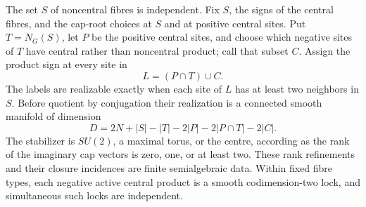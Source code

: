 \begin{theorem}\label{geo:character-atlas}
The set \(S\) of noncentral fibres is independent. Fix \(S\), the signs of the central fibres, and the cap-root choices at \(S\) and at positive central sites. Put \(T=N_G(S)\), let \(P\) be the positive central sites, and choose which negative sites of \(T\) have central rather than noncentral product; call that subset \(C\). Assign the product sign at every site in
\[
                        L=(P\cap T)\cup C.
\]
The labels are realizable exactly when each site of \(L\) has at least two neighbors in \(S\). Before quotient by conjugation their realization is a connected smooth manifold of dimension
\begin{equation}
 D=2N+|S|-|T|-2|P|-2|P\cap T|-2|C|.
 \label{geo:stratumdimension}
\end{equation}
The stabilizer is \(SU(2)\), a maximal torus, or the centre, according as the rank of the imaginary cap vectors is zero, one, or at least two. These rank refinements and their closure incidences are finite semialgebraic data. Within fixed fibre types, each negative active central product is a smooth codimension-two lock, and simultaneous such locks are independent.
\end{theorem}

